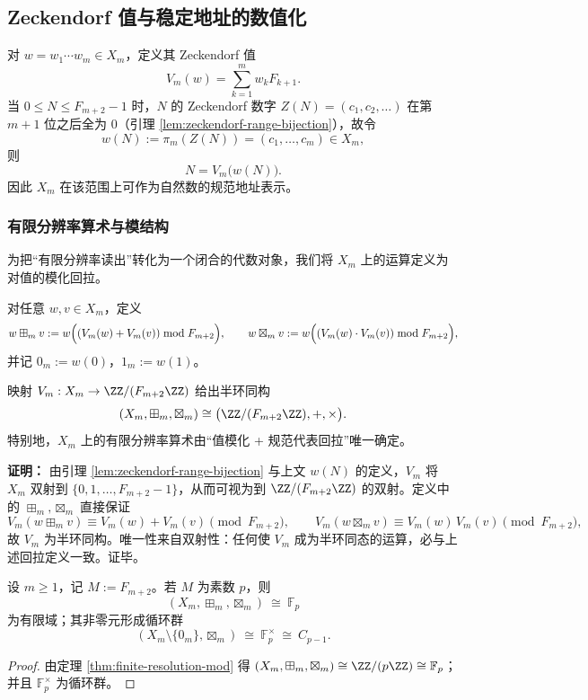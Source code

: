 \subsection{Zeckendorf 值与稳定地址的数值化}\label{subsec:emergent-arithmetic-zeckendorf-value-address}

对 $w=w_1\cdots w_m\in X_m$，定义其 Zeckendorf 值
\[
V_m(w)=\sum_{k=1}^m w_k F_{k+1}.
\]
当 $0\le N\le F_{m+2}-1$ 时，$N$ 的 Zeckendorf 数字 $Z(N)=(c_1,c_2,\dots)$ 在第 $m+1$ 位之后全为 $0$（引理 \ref{lem:zeckendorf-range-bijection}），故令
\[
w(N):=\pi_m(Z(N))=(c_1,\dots,c_m)\in X_m,
\]
则
\[
N=V_m\bigl(w(N)\bigr).
\]
因此 $X_m$ 在该范围上可作为自然数的规范地址表示。

\subsubsection{有限分辨率算术与模结构}
为把“有限分辨率读出”转化为一个闭合的代数对象，我们将 $X_m$ 上的运算定义为对值的模化回拉。

\begin{definition}[有限分辨率算术]
对任意 $w,v\in X_m$，定义
\[
w\boxplus_m v:=w\Bigl((V_m(w)+V_m(v))\bmod F_{m+2}\Bigr),
\qquad
w\boxtimes_m v:=w\Bigl((V_m(w)\cdot V_m(v))\bmod F_{m+2}\Bigr),
\]
并记 $0_m:=w(0)$，$1_m:=w(1)$。
\end{definition}

\begin{theorem}[有限分辨率算术的模结构]
\label{thm:finite-resolution-mod}
映射 $V_m:X_m\to\ZZ/(F_{m+2}\ZZ)$ 给出半环同构
\[
(X_m,\boxplus_m,\boxtimes_m)\cong\bigl(\ZZ/(F_{m+2}\ZZ),+,\times\bigr).
\]
特别地，$X_m$ 上的有限分辨率算术由“值模化 + 规范代表回拉”唯一确定。
\end{theorem}

\textbf{证明：}
由引理 \ref{lem:zeckendorf-range-bijection} 与上文 $w(N)$ 的定义，$V_m$ 将 $X_m$ 双射到 $\{0,1,\dots,F_{m+2}-1\}$，从而可视为到 $\ZZ/(F_{m+2}\ZZ)$ 的双射。定义中的 $\boxplus_m,\boxtimes_m$ 直接保证
\[
V_m(w\boxplus_m v)\equiv V_m(w)+V_m(v)\pmod{F_{m+2}},
\qquad
V_m(w\boxtimes_m v)\equiv V_m(w)\,V_m(v)\pmod{F_{m+2}},
\]
故 $V_m$ 为半环同构。唯一性来自双射性：任何使 $V_m$ 成为半环同态的运算，必与上述回拉定义一致。证毕。

\begin{corollary}\label{cor:field-phase-fib-prime}
设 $m\ge 1$，记 $M:=F_{m+2}$。若 $M$ 为素数 $p$，则
\[
(X_m,\boxplus_m,\boxtimes_m)\ \cong\ \mathbb{F}_p
\]
为有限域；其非零元形成循环群
\[
(X_m\setminus\{0_m\},\boxtimes_m)\ \cong\ \mathbb{F}_p^\times\ \cong\ C_{p-1}.
\]
\end{corollary}
\begin{proof}
由定理 \ref{thm:finite-resolution-mod} 得 $(X_m,\boxplus_m,\boxtimes_m)\cong \ZZ/(p\ZZ)\cong \mathbb{F}_p$；并且 \(\mathbb{F}_p^\times\) 为循环群。
\end{proof}

